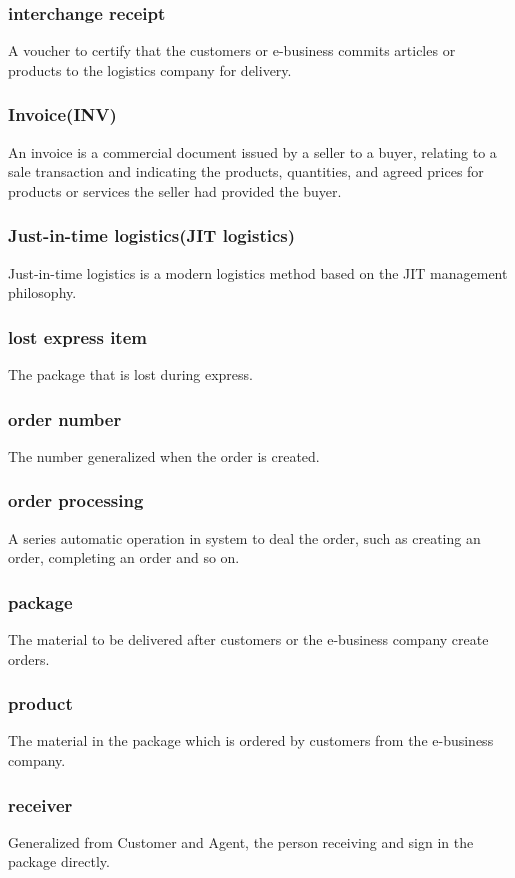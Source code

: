 \documentclass[12pt]{scrreprt}
\begin{document}
\begin{spacing}{0.7}
\subsubsection{interchange receipt}
A voucher to certify that the customers or e-business commits articles or products to the logistics company for delivery.
\subsubsection{Invoice(INV)}
An invoice is a commercial document issued by a seller to a buyer, relating to a sale transaction and indicating the products, quantities, and agreed prices for products or services the seller had provided the buyer.
\subsubsection{Just-in-time logistics(JIT logistics)}
Just-in-time logistics is a modern logistics method based on the JIT management philosophy.
\subsubsection{lost express item}
The package that is lost during express.
\subsubsection{order number}
The number generalized when the order is created.
\subsubsection{order processing}
A series automatic operation in system to deal the order, such as creating an order, completing an order and so on.
\subsubsection{package}
The material to be delivered after customers or the e-business company create orders.
\subsubsection{product}
The material in the package which is ordered by customers from the e-business company.
\subsubsection{receiver}
Generalized from Customer and Agent, the person receiving and sign in the package directly.

\end{spacing}
\end{document}
